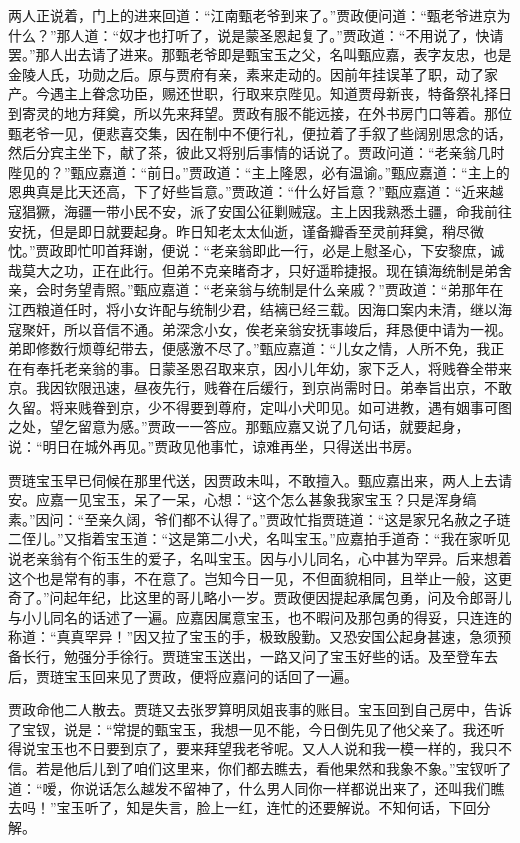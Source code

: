 \begin{parag}
    两人正说着，门上的进来回道：“江南甄老爷到来了。”贾政便问道：“甄老爷进京为什么？”那人道：“奴才也打听了，说是蒙圣恩起复了。”贾政道：“不用说了，快请罢。”那人出去请了进来。那甄老爷即是甄宝玉之父，名叫甄应嘉，表字友忠，也是金陵人氏，功勋之后。原与贾府有亲，素来走动的。因前年挂误革了职，动了家产。今遇主上眷念功臣，赐还世职，行取来京陛见。知道贾母新丧，特备祭礼择日到寄灵的地方拜奠，所以先来拜望。贾政有服不能远接，在外书房门口等着。那位甄老爷一见，便悲喜交集，因在制中不便行礼，便拉着了手叙了些阔别思念的话，然后分宾主坐下，献了茶，彼此又将别后事情的话说了。贾政问道：“老亲翁几时陛见的？”甄应嘉道：“前日。”贾政道：“主上隆恩，必有温谕。”甄应嘉道：“主上的恩典真是比天还高，下了好些旨意。”贾政道：“什么好旨意？”甄应嘉道：“近来越寇猖獗，海疆一带小民不安，派了安国公征剿贼寇。主上因我熟悉土疆，命我前往安抚，但是即日就要起身。昨日知老太太仙逝，谨备瓣香至灵前拜奠，稍尽微忱。”贾政即忙叩首拜谢，便说：“老亲翁即此一行，必是上慰圣心，下安黎庶，诚哉莫大之功，正在此行。但弟不克亲睹奇才，只好遥聆捷报。现在镇海统制是弟舍亲，会时务望青照。”甄应嘉道：“老亲翁与统制是什么亲戚？”贾政道：“弟那年在江西粮道任时，将小女许配与统制少君，结褵已经三载。因海口案内未清，继以海寇聚奸，所以音信不通。弟深念小女，俟老亲翁安抚事竣后，拜恳便中请为一视。弟即修数行烦尊纪带去，便感激不尽了。”甄应嘉道：“儿女之情，人所不免，我正在有奉托老亲翁的事。日蒙圣恩召取来京，因小儿年幼，家下乏人，将贱眷全带来京。我因钦限迅速，昼夜先行，贱眷在后缓行，到京尚需时日。弟奉旨出京，不敢久留。将来贱眷到京，少不得要到尊府，定叫小犬叩见。如可进教，遇有姻事可图之处，望乞留意为感。”贾政一一答应。那甄应嘉又说了几句话，就要起身，说：“明日在城外再见。”贾政见他事忙，谅难再坐，只得送出书房。
\end{parag}


\begin{parag}
    贾琏宝玉早已伺候在那里代送，因贾政未叫，不敢擅入。甄应嘉出来，两人上去请安。应嘉一见宝玉，呆了一呆，心想：“这个怎么甚象我家宝玉？只是浑身缟素。”因问：“至亲久阔，爷们都不认得了。”贾政忙指贾琏道：“这是家兄名赦之子琏二侄儿。”又指着宝玉道：“这是第二小犬，名叫宝玉。”应嘉拍手道奇：“我在家听见说老亲翁有个衔玉生的爱子，名叫宝玉。因与小儿同名，心中甚为罕异。后来想着这个也是常有的事，不在意了。岂知今日一见，不但面貌相同，且举止一般，这更奇了。”问起年纪，比这里的哥儿略小一岁。贾政便因提起承属包勇，问及令郎哥儿与小儿同名的话述了一遍。应嘉因属意宝玉，也不暇问及那包勇的得妥，只连连的称道：“真真罕异！”因又拉了宝玉的手，极致殷勤。又恐安国公起身甚速，急须预备长行，勉强分手徐行。贾琏宝玉送出，一路又问了宝玉好些的话。及至登车去后，贾琏宝玉回来见了贾政，便将应嘉问的话回了一遍。
\end{parag}


\begin{parag}
    贾政命他二人散去。贾琏又去张罗算明凤姐丧事的账目。宝玉回到自己房中，告诉了宝钗，说是：“常提的甄宝玉，我想一见不能，今日倒先见了他父亲了。我还听得说宝玉也不日要到京了，要来拜望我老爷呢。又人人说和我一模一样的，我只不信。若是他后儿到了咱们这里来，你们都去瞧去，看他果然和我象不象。”宝钗听了道：“嗳，你说话怎么越发不留神了，什么男人同你一样都说出来了，还叫我们瞧去吗！”宝玉听了，知是失言，脸上一红，连忙的还要解说。不知何话，下回分解。
\end{parag}